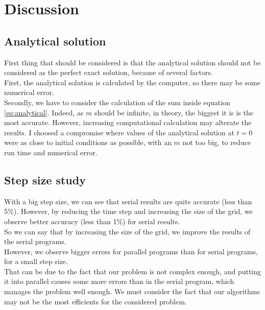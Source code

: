 \documentclass{article}
\begin{document}
        \newpage
        \section{Discussion}
            \subsection{Analytical solution}
                First thing that should be considered is that the analytical solution should not be
                considered as the perfect exact solution, because of several factors.
                \\
                First, the analytical solution is calculated by the computer, so there may be some numerical error.
                \\
                Secondly, we have to consider the calculation of the sum inside equation \eqref{eq:analytical}.
                Indeed, as $m$ should be infinite, in theory, the biggest it is is the most accurate. However, increasing computational
                calculation may alterate the results. I choosed a compromise
                where values of the analytical solution at $t=0$ were as close to initial conditions as possible, with an $m$ not too big,
                to reduce run time and numerical error.
                \\
                
            \subsection{Step size study}
                With a big step size, we can see that serial results are quite accurate (less than 5\%). However,
                by reducing the time step and increasing the size of the grid, we observe better accuracy (less than 1\%)
                for serial results.\\
                So we can say that by increasing the size of the grid, we improve the results of the serial programs.\\

                However, we observe bigger errors for parallel programs than for serial programs, 
                for a small step size. \\
                That can be due to the fact that our problem is not complex enough, and putting it into parallel
                causes some more errors than in the serial program, which manages the problem well enough.
                We must consider the fact that our algorithms may not be the most efficients for the considered problem.
\end{document}
